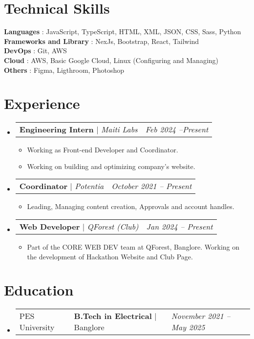 \documentclass[letterpaper,10pt]{article}
\makeatletter
\newcommand{\sectionspace}{
\vspace{-20pt}
}
\newcommand{\subheadingtitlevspace}{
\vspace{-3pt}
}
\newcommand{\resumeItem}[1]{
  \item{
    {#1 \vspace{-4pt}}
  }
}
\newcommand{\titleItem}[1]{
  \textbf{#1}
}
\newcommand{\resumeSubheading}[4]{
  \item
     \begin{tabular*}{0.97\textwidth}[t]{l@{\extracolsep{\fill}}l@{}l}     
      {#1} & \titleItem{#3} | {#2} & \textit{#4}\\
    \end{tabular*}\vspace{-10pt}
}
\newcommand{\resumeProjectHeading}[2]{
    \item
    \begin{tabular*}{0.97\textwidth}{l@{\extracolsep{\fill}}r}
      #1 & \textit{ #2} \\
    \end{tabular*}\vspace{-9pt}
}
\newcommand{\resumeSubHeadingListStart}{\subheadingtitlevspace\begin{itemize}[leftmargin=0.15in, label={}]}
\newcommand{\resumeSubHeadingListEnd}{\end{itemize}}
\newcommand{\resumeItemListStart}{
\begin{itemize}}
\newcommand{\resumeItemListEnd}{
\end{itemize}\vspace{-8pt}}
\makeatother
\begin{document}
\section{Technical Skills}
\subheadingtitlevspace
 \begin{itemize}[leftmargin=0.15in, label={}]
    {\item{
     \titleItem{Languages}{: JavaScript, TypeScript, HTML, XML, JSON, CSS, Sass, Python} \\
     \titleItem{Frameworks and Library}{: NexJs, Bootstrap, React, Tailwind} \\
     \titleItem{DevOps}{: Git, AWS} \\
     \titleItem{Cloud}{: AWS, Basic Google Cloud, Linux (Configuring and Managing)} \\
     \titleItem{Others}{: Figma, Ligthroom, Photoshop}
    }}
 \end{itemize}
\sectionspace



    

\section{Experience}
  \resumeSubHeadingListStart
      \resumeProjectHeading
           {\titleItem{{Engineering Intern}} $|$ \emph{Maiti Labs}}{Feb 2024 --Present}
      \resumeItemListStart
        \resumeItem{Working as Front-end Developer and Coordinator.}
        \resumeItem{Working on building and optimizing company's website.}
      \resumeItemListEnd


    \resumeProjectHeading
           {\titleItem{{Coordinator}} $|$ \emph{Potentia}}{October 2021 -- Present}
      \resumeItemListStart
        \resumeItem{Leading, Managing content creation, Approvals and account handles.}
        \resumeItemListEnd
        
    \resumeProjectHeading
           {\titleItem{{Web Developer}} $|$ \emph{QForest (Club)}}{Jan 2024 -- Present}
      \resumeItemListStart    
    \resumeItem{Part of the CORE WEB DEV team at QForest, Banglore. Working on the development of Hackathon Website and Club Page.}
    \resumeItemListEnd
  \resumeSubHeadingListEnd



\section{Education}
  \resumeSubHeadingListStart
    \resumeSubheading
      {PES University}{Banglore}
      {B.Tech in Electrical}{November 2021 -- May 2025} 
  \resumeSubHeadingListEnd
\vspace{-8pt}
\end{document}
